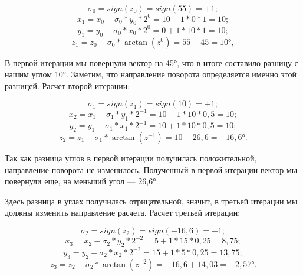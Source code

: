 \documentclass[a4paper,oneside ,14pt]{extreport}
\begin{document}
\begin{displaymath}	
\sigma_0 = sign(z_0) = sign(55) = + 1;
\end{displaymath}
\begin{displaymath}	
x_{1} = x_{0} - \sigma_0*y_0*2^{0} = 10 - 1*0*1 = 10;
\end{displaymath}
\begin{displaymath}
y_{1} = y_{0} + \sigma_0*x_0*2^{0} = 0 + 1*10*1 = 10;
\end{displaymath}
\begin{displaymath}	
z_{1} = z_{0} - \sigma_0*\arctan(z^{0}) = 55 - 45 = 10°,
\end{displaymath}

В первой итерации мы повернули вектор 
на 45°, что в итоге составило разницу с нашим углом 10°. Заметим, что направление поворота определяется именно этой разницей. Расчет второй итерации:

\begin{displaymath}	
\sigma_1 = sign(z_1) = sign(10) = + 1;
\end{displaymath}
\begin{displaymath}	
x_{2} = x_{1} - \sigma_1*y_1*2^{-1} = 10 - 1*10*0,5 = 10;
\end{displaymath}
\begin{displaymath}
y_{2} = y_{1} + \sigma_1*x_1*2^{-1} = 10 + 1*10*0,5 = 10;
\end{displaymath}
\begin{displaymath}	
z_{2} = z_{1} - \sigma_1*\arctan(z^{-1}) = 10 - 26,6 = -16,6°.
\end{displaymath}

Так как разница углов в первой итерации 
получилась положительной, направление 
поворота не изменилось. Полученный в первой итерации вектор мы повернули еще, 
на меньший угол — 26,6°.

Здесь разница в углах получилась отрицательной, значит, 
в третьей итерации мы должны изменить направление расчета.
Расчет третьей итерации:

\begin{displaymath}	
\sigma_2 = sign(z_2) = sign(-16,6) = - 1;
\end{displaymath}
\begin{displaymath}	
x_{3} = x_{2} - \sigma_2*y_2*2^{-2} = 5 + 1*15*0,25 = 8,75;
\end{displaymath}
\begin{displaymath}
y_{3} = y_{2} + \sigma_2*x_2*2^{-2} = 15 + 1*5*0,25 = 13,75;
\end{displaymath}
\begin{displaymath}	
z_{3} = z_{2} - \sigma_2*\arctan(z^{-2}) = -16,6 + 14,03 = -2,57°.
\end{displaymath}
\end{document}

